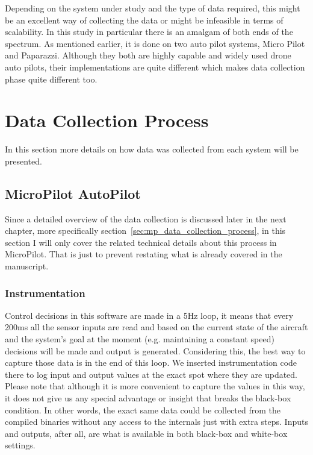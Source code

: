 Depending on the system under study and the type of data required, this might be an excellent way of collecting the data or might be infeasible in terms of scalability. \cite{mashhadi2019empirical} 
In this study in particular there is an amalgam of both ends of the spectrum. As mentioned earlier, it is done on two auto pilot systems, Micro Pilot and Paparazzi. \cite{hattenberger2014using}
Although they both are highly capable and widely used drone auto pilots, their implementations are quite different which makes data collection phase quite different too.

\section{Data Collection Process}
In this section more details on how data was collected from each system will be presented. 

\subsection{MicroPilot AutoPilot}

Since a detailed overview of the data collection is discussed later in the next chapter, more specifically section~\ref{sec:mp_data_collection_process}, in this section I will only cover the related technical details about this process in MicroPilot. That is just to prevent restating what is already covered in the manuscript.

\subsubsection{Instrumentation}
Control decisions in this software are made in a 5Hz loop, it means that every 200ms all the sensor inputs are read and based on the current state of the aircraft and the system's goal at the moment (e.g. maintaining a constant speed) decisions will be made and output is generated. Considering this, the best way to capture those data is in the end of this loop. We inserted instrumentation code there to log input and output values at the exact spot where they are updated. 
Please note that although it is more convenient to capture the values in this way, it does not give us any special advantage or insight that breaks the black-box condition. In other words, the exact same data could be collected from the compiled binaries without any access to the internals just with extra steps. Inputs and outputs, after all, are what is available in both black-box and white-box settings.

